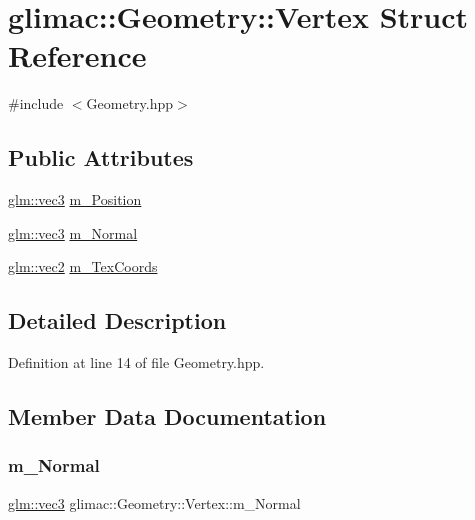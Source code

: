 \hypertarget{structglimac_1_1_geometry_1_1_vertex}{}\section{glimac\+:\+:Geometry\+:\+:Vertex Struct Reference}
\label{structglimac_1_1_geometry_1_1_vertex}


{\ttfamily \#include $<$Geometry.\+hpp$>$}

\subsection*{Public Attributes}
\begin{DoxyCompactItemize}
\item 
\hyperlink{group__core__types_ga1c47e8b3386109bc992b6c48e91b0be7}{glm\+::vec3} \hyperlink{structglimac_1_1_geometry_1_1_vertex_a94d0358d5cd9963f2565fdb7f28ee3b8}{m\+\_\+\+Position}
\item 
\hyperlink{group__core__types_ga1c47e8b3386109bc992b6c48e91b0be7}{glm\+::vec3} \hyperlink{structglimac_1_1_geometry_1_1_vertex_aacc943d9b84fe33e7b22cc9d36f178f0}{m\+\_\+\+Normal}
\item 
\hyperlink{group__core__types_gaa1618f51db67eaa145db101d8c8431d8}{glm\+::vec2} \hyperlink{structglimac_1_1_geometry_1_1_vertex_ab5633b199c86e43426871f1dfc163af3}{m\+\_\+\+Tex\+Coords}
\end{DoxyCompactItemize}


\subsection{Detailed Description}


Definition at line 14 of file Geometry.\+hpp.



\subsection{Member Data Documentation}
\mbox{\label{structglimac_1_1_geometry_1_1_vertex_aacc943d9b84fe33e7b22cc9d36f178f0}} 
\subsubsection{\texorpdfstring{m\+\_\+\+Normal}{m\_Normal}}
{\footnotesize\ttfamily \hyperlink{group__core__types_ga1c47e8b3386109bc992b6c48e91b0be7}{glm\+::vec3} glimac\+::\+Geometry\+::\+Vertex\+::m\+\_\+\+Normal}



